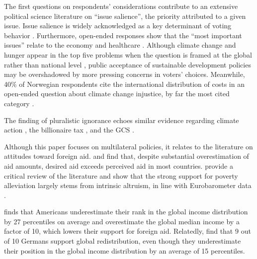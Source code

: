 \documentclass[12pt,english]{article}
\begin{document}

The first questions on respondents' considerations contribute to an extensive political science literature on ``issue salience'', the priority attributed to a given issue. Issue salience is widely acknowledged as a key determinant of voting behavior \citep{repass_issue_1971,egan_partisan_2013,krosnick_role_1988,dennison_review_2019,edwards_explaining_1995}. Furthermore, open-ended responses show that the ``most important issues'' relate to the economy and healthcare \citep{wlezien_salience_2005}. Although climate change and hunger appear in the top five problems when the question is framed at the global rather than national level \citep{yeager_measuring_2011}, public acceptance of sustainable development policies may be overshadowed by more pressing concerns in voters' choices. Meanwhile, 40\% of Norwegian respondents cite the international distribution of costs in an open-ended question about climate change injustice, by far the most cited category \citep{gregersen_poor_2025}. %

The finding of pluralistic ignorance echoes similar evidence regarding %
climate action \citep{andre_misperceived_2024,andre_globally_2024,mildenberger_beliefs_2019}, the billionaire tax \citep{cappelen_majority_2025}, and the GCS \citep{fabre_majority_2025}. 

Although this paper focuses on multilateral policies, it relates to the literature on attitudes toward foreign aid. \cite{kaufmann_foreign_2019} and \cite{fabre_majority_2025} find that, despite substantial overestimation of aid amounts, desired aid exceeds perceived aid in most countries. \cite{hudson_mile_2012} provide a critical review of the literature and show that the strong support for poverty alleviation largely stems from intrinsic altruism, in line with Eurobarometer data \citep{cho_ideology_2024}. 

\cite{nair_misperceptions_2018} finds that Americans underestimate their rank in the global income distribution by 27 percentiles on average and overestimate the global median income by a factor of 10, which lowers their support for foreign aid. Relatedly, \cite{fehr_your_2022} find that 9 out of 10 Germans support global redistribution, even though they underestimate their position in the global income distribution by an average of 15 percentiles. %
\end{document}
